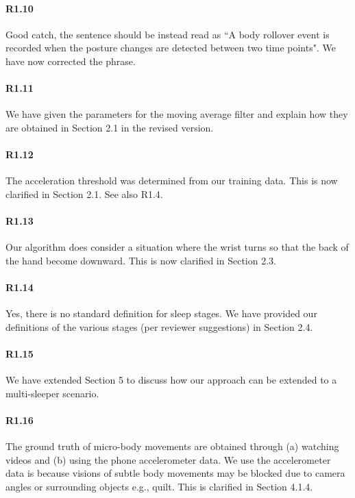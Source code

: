 \paragraph{R1.10} Good catch, the sentence should be instead read as ``A body rollover event is recorded when the posture changes are detected between
two time points". We have now corrected the phrase.

\paragraph{R1.11} We have given the parameters for the moving average filter and explain how they are obtained in Section 2.1 in the revised version.

\paragraph{R1.12} The acceleration threshold was determined from our training data. This is now clarified in Section 2.1. See also
R1.4.

\vspace{-2mm}
\paragraph{R1.13} Our algorithm does consider a situation where the wrist turns so that the back of the hand become downward. This is now clarified in Section 2.3.

\paragraph{R1.14} Yes, there is no standard definition for sleep stages. We have provided our definitions of the various stages (per reviewer suggestions) in Section 2.4.

\paragraph{R1.15} We have extended Section 5 to discuss how our approach can be extended to a multi-sleeper scenario.

\paragraph{R1.16} The ground truth of micro-body movements are obtained through (a) watching videos and (b) using the phone accelerometer data. We use the accelerometer data is because visions of subtle body movements may be blocked due to camera angles or surrounding objects e.g., quilt. This is clarified in Section 4.1.4.

